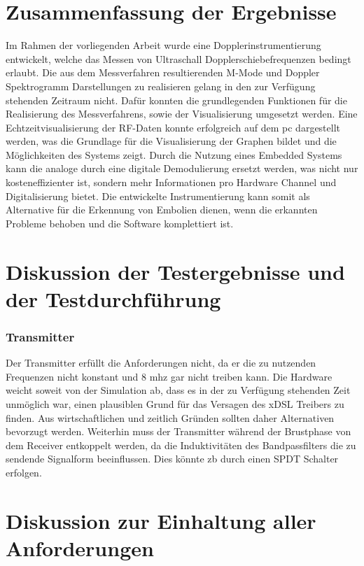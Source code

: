 \section{Zusammenfassung der Ergebnisse}\label{sec:discussion_results}
Im Rahmen der vorliegenden Arbeit wurde eine Dopplerinstrumentierung entwickelt, welche das Messen von Ultraschall Dopplerschiebefrequenzen bedingt erlaubt. Die aus dem Messverfahren resultierenden M-Mode und Doppler Spektrogramm Darstellungen zu realisieren gelang in den zur Verfügung stehenden Zeitraum nicht. Dafür konnten die grundlegenden Funktionen für die Realisierung des Messverfahrens, sowie der Visualisierung umgesetzt werden. Eine Echtzeitvisualisierung der RF-Daten konnte erfolgreich auf dem \ac{pc} dargestellt werden, was die Grundlage für die Visualisierung der Graphen bildet und die Möglichkeiten des Systems zeigt. Durch die Nutzung eines Embedded Systems kann die analoge durch eine digitale Demodulierung ersetzt werden, was nicht nur kosteneffizienter ist, sondern mehr Informationen pro Hardware Channel und Digitalisierung bietet. Die entwickelte Instrumentierung    kann somit als Alternative für die Erkennung von Embolien dienen, wenn die erkannten Probleme behoben und die Software komplettiert ist.
\section{Diskussion der Testergebnisse und der Testdurchführung}\label{sec:discussion_testresults}
\subsubsection*{Transmitter}
Der Transmitter erfüllt die Anforderungen nicht, da er die zu nutzenden Frequenzen nicht konstant und 8 \ac{mhz} gar nicht treiben kann. Die Hardware weicht soweit von der Simulation ab, dass es in der zu Verfügung stehenden Zeit unmöglich war, einen plausiblen Grund für das Versagen des xDSL Treibers zu finden. Aus wirtschaftlichen und zeitlich Gründen sollten daher Alternativen bevorzugt werden. Weiterhin muss der Transmitter während der Brustphase von dem Receiver entkoppelt werden, da die Induktivitäten des Bandpassfilters die zu sendende Signalform beeinflussen. Dies könnte \ac{zb} durch einen SPDT Schalter erfolgen.
\section{Diskussion zur Einhaltung aller Anforderungen}\label{sec:discuss_all}
